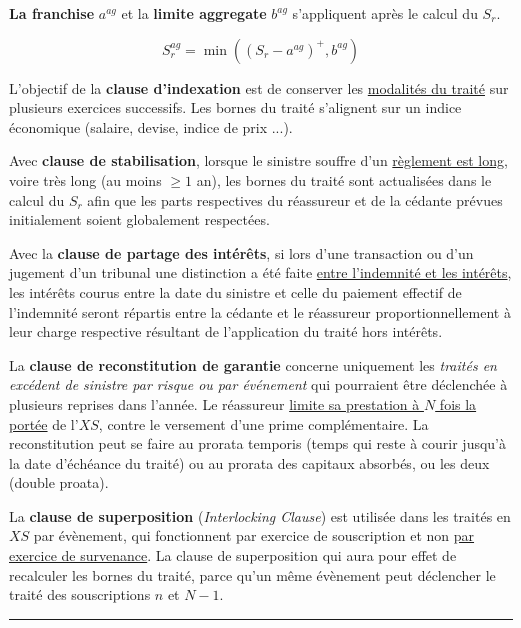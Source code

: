 \begin{f}

\textbf{La franchise} $a^{ag}$ et la \textbf{limite aggregate}  $b^{ag}$  s'appliquent après le calcul du $S_r$. 

$$
S_r^{ag} = \min\left( \left(S_r - a^{ag}  \right)^+,b^{ag}\right)  
$$
\medskip

L'objectif de la \textbf{clause d'indexation} est de conserver les \underline{modalités du traité} sur plusieurs exercices successifs.  Les bornes du traité s'alignent sur un indice économique (salaire, devise, indice de prix ...).
\medskip

Avec \textbf{clause de stabilisation}, lorsque le sinistre souffre d'un \underline{règlement est long}, voire très long (au moins $\geq 1$ an), les bornes du traité sont actualisées dans le calcul du $S_r$ afin que les parts respectives du réassureur et de la cédante prévues initialement soient globalement respectées.
\medskip
	

Avec la \textbf{clause de partage des intérêts}, si lors d'une transaction ou d'un jugement d'un tribunal une distinction a été faite \underline{entre
		l'indemnité et les intérêts}, les intérêts courus entre la date du sinistre et celle du paiement effectif de l'indemnité seront répartis entre la cédante et le réassureur proportionnellement à
	leur charge respective résultant de l'application du traité hors intérêts.
\medskip


La \textbf{clause de reconstitution de garantie}
concerne uniquement les \emph{traités en excédent de sinistre par risque ou par événement} qui pourraient être déclenchée à plusieurs reprises dans l'année.
Le réassureur \underline{limite sa prestation à $N $ fois la portée} de l'$XS$, contre le versement d'une prime complémentaire. 
La reconstitution peut se faire au prorata temporis (temps qui reste à courir jusqu'à la date
d'échéance du traité) ou au prorata des capitaux absorbés, ou les deux (double proata). 

La \textbf{clause de superposition}
(\emph{Interlocking Clause})
 est utilisée dans les traités en $XS$ par évènement,
qui fonctionnent par exercice de souscription et non \underline{par exercice de survenance}.
La clause de
superposition qui aura pour effet de recalculer les bornes du traité, parce qu'un même évènement peut déclencher le traité des souscriptions $n$ et $N-1$.
\end{f}
\hrule

